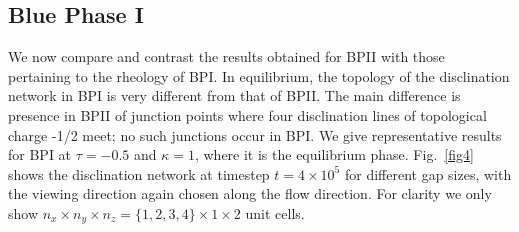 \documentclass[12pt,twoside]{iopart}
\newcommand{\ex}[1]{\times10^{#1}}
\begin{document}
\subsection{Blue Phase I}\label{sec_bpi}

We now compare and contrast the results obtained for BPII with those
pertaining to the rheology of BPI. In equilibrium, the topology
of the disclination network in BPI is very different from that of BPII.
The main difference is presence in BPII of junction points where four
disclination lines of topological charge -1/2 meet; no such junctions
occur in BPI. We give representative results for BPI at $\tau=-0.5$
and $\kappa=1$, where it is the equilibrium phase.
Fig.~\ref{fig4} shows the disclination network at timestep $t=4\ex{5}$
for different gap sizes, with the viewing direction again chosen along
the flow direction.
For clarity we only show $n_x \times n_y \times n_z=\{1,2,3,4\}\times1\times2$
unit cells.
\end{document}
